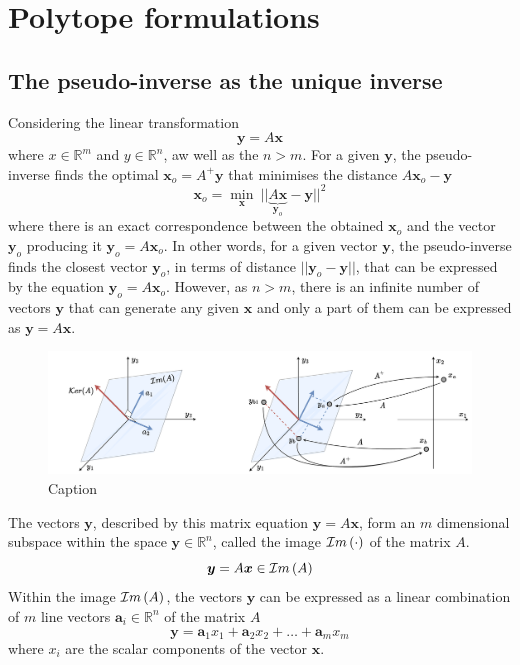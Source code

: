 \chapter{Polytope formulations}

\section{The pseudo-inverse as the unique inverse} 
\label{ch:pseudoinverse_unique}

Considering the linear transformation 
\begin{equation}
    \bm{y} = A\bm{x}
\end{equation}
where $x\in\mathbb{R}^m$ and  $y\in\mathbb{R}^n$, aw well as the $n>m$.  For a given $\bm{y}$, the pseudo-inverse finds the optimal $\bm{x}_o=A^+\bm{y}$ that minimises the distance $A\bm{x}_o-\bm{y}$
\begin{equation}
    \bm{x}_o = \min_{\bm{x}} ~|| \underbrace{A\bm{x}}_{\bm{y}_o} - \bm{y}||^2 
    \label{eq:pseudoinverse_opt}
\end{equation}
where there is an exact correspondence between the obtained $\bm{x}_o$ and the vector $\bm{y}_o$ producing it $\bm{y}_o=A\bm{x}_o$.
In other words, for a given vector $\bm{y}$, the pseudo-inverse finds the closest vector $\bm{y}_o$, in terms of distance $||\bm{y}_o-\bm{y}||$, that can be expressed by the equation $\bm{y}_o=A\bm{x}_o$. However, as $n>m$, there is an infinite number of vectors $\bm{y}$ that can generate any given $\bm{x}$ and only a part of them can be expressed as $\bm{y}=A\bm{x}$.

\begin{figure}
    \centering
    \includegraphics[width=\linewidth]{Chapters/imgs/pseudo_inverse_intuition_aio.pdf}
    \caption{Caption}
    \label{fig:pseudoinverse_intuition}
\end{figure}

The vectors $\bm{y}$, described by this matrix equation $\bm{y} = A\bm{x}$, form an $m$ dimensional subspace within the space $\bm{y}\in\mathbb{R}^n$, called the image $\mathcal{I}m\left(\cdot\right)$ of the matrix $A$. 
\begin{equation}
    \bm{y}=A\bm{x} \in \mathcal{I}m\left(A\right)
\end{equation}
Within the image $\mathcal{I}m\left(A\right)$, the vectors $\bm{y}$ can be expressed as a linear combination of $m$ line vectors $\bm{a}_i\in\mathbb{R}^n$ of the matrix $A$ \cite{LARSON2013}
\begin{equation}
    \bm{y} = \bm{a}_1x_1 +  \bm{a}_2x_2 + \ldots +  \bm{a}_mx_m
\end{equation}
where $x_i$ are the scalar components of the vector $\bm{x}$.


